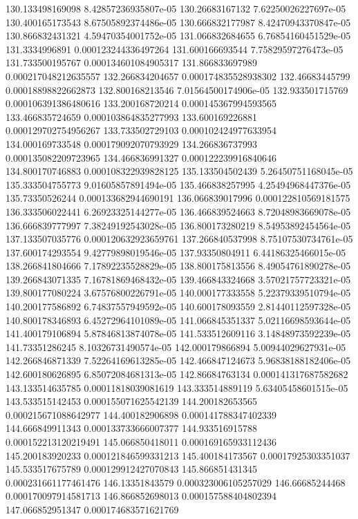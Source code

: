 {130.133498169098 8.42857236935807e-05
130.26683167132 7.62250026227697e-05
130.400165173543 8.67505892374486e-05
130.666832177987 8.42470943370847e-05
130.866832431321 4.59470354001752e-05
131.066832684655 6.76854160451529e-05
131.3334996891 0.000123244336497264
131.600166693544 7.75829597276473e-05
131.733500195767 0.000134601084905317
131.866833697989 0.000217048212635557
132.266834204657 0.000174835528938302
132.46683445799 0.00018898822662873
132.800168213546 7.01564500174906e-05
132.933501715769 0.000106391386480616
133.200168720214 0.000145367994593565
133.466835724659 0.000103864835277993
133.600169226881 0.000129702754956267
133.733502729103 0.000102424977633954
134.000169733548 0.000179092070793929
134.266836737993 0.000135082209723965
134.466836991327 0.000122239916840646
134.800170746883 0.000108322939828125
135.133504502439 5.26450751168045e-05
135.333504755773 9.01605857891494e-05
135.466838257995 4.25494968447376e-05
135.73350526244 0.000133682944690191
136.066839017996 0.000122810569181575
136.333506022441 6.26923325144277e-05
136.466839524663 8.72048983669078e-05
136.666839777997 7.38249192543028e-05
136.800173280219 8.54953892454564e-05
137.133507035776 0.000120632923659761
137.266840537998 8.75107530734761e-05
137.600174293554 9.42779898019546e-05
137.93350804911 6.44186325466015e-05
138.266841804666 7.17892235528829e-05
138.800175813556 8.49054761890278e-05
139.266843071335 7.16781869468432e-05
139.466843324668 3.57021757723321e-05
139.800177080224 3.67576800226791e-05
140.000177333558 5.22379339510794e-05
140.200177586892 6.74837557949592e-05
140.600178093559 2.81440112597328e-05
140.800178346893 6.45272964101089e-05
141.066845351337 5.02116698593644e-05
141.400179106894 5.87846813874078e-05
141.533512609116 3.14848973592239e-05
141.73351286245 8.10326731490574e-05
142.000179866894 5.00944029627931e-05
142.266846871339 7.52264169613285e-05
142.466847124673 5.96838188182406e-05
142.600180626895 6.85072084681313e-05
142.86684763134 0.000141317687582682
143.133514635785 0.00011818039081619
143.333514889119 5.63405458601515e-05
143.533515142453 0.000155071625542139
144.200182653565 0.000215671088642977
144.400182906898 0.000141788347402339
144.666849911343 0.000133733666007377
144.933516915788 0.000152213120219491
145.066850418011 0.000169165933112436
145.200183920233 0.000121846599331213
145.400184173567 0.00017925303351037
145.533517675789 0.000129912427070843
145.866851431345 0.000231661177461476
146.13351843579 0.000323006105257029
146.66685244468 0.000170097914581713
146.866852698013 0.000157588404802394
147.066852951347 0.000174683571621769
}
